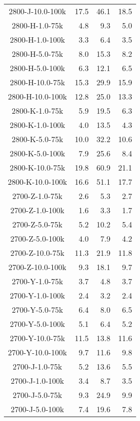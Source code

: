 \begin{longtable}{crrr}
    2800-J-10.0-100k &   17.5 &   46.1 &   18.5 \\
    2800-H-1.0-75k   &    4.8 &    9.3 &    5.0 \\
    2800-H-1.0-100k  &    3.3 &    6.4 &    3.5 \\
    2800-H-5.0-75k   &    8.0 &   15.3 &    8.2 \\
    2800-H-5.0-100k  &    6.3 &   12.1 &    6.5 \\
    2800-H-10.0-75k  &   15.3 &   29.9 &   15.9 \\
    2800-H-10.0-100k &   12.8 &   25.0 &   13.3 \\
    2800-K-1.0-75k   &    5.9 &   19.5 &    6.3 \\
    2800-K-1.0-100k  &    4.0 &   13.5 &    4.3 \\
    2800-K-5.0-75k   &   10.0 &   32.2 &   10.6 \\
    2800-K-5.0-100k  &    7.9 &   25.6 &    8.4 \\
    2800-K-10.0-75k  &   19.8 &   60.9 &   21.1 \\
    2800-K-10.0-100k &   16.6 &   51.1 &   17.7 \\
    2700-Z-1.0-75k   &    2.6 &    5.3 &    2.7 \\
    2700-Z-1.0-100k  &    1.6 &    3.3 &    1.7 \\
    2700-Z-5.0-75k   &    5.2 &   10.2 &    5.4 \\
    2700-Z-5.0-100k  &    4.0 &    7.9 &    4.2 \\
    2700-Z-10.0-75k  &   11.3 &   21.9 &   11.8 \\
    2700-Z-10.0-100k &    9.3 &   18.1 &    9.7 \\
    2700-Y-1.0-75k   &    3.7 &    4.8 &    3.7 \\
    2700-Y-1.0-100k  &    2.4 &    3.2 &    2.4 \\
    2700-Y-5.0-75k   &    6.4 &    8.0 &    6.5 \\
    2700-Y-5.0-100k  &    5.1 &    6.4 &    5.2 \\
    2700-Y-10.0-75k  &   11.5 &   13.8 &   11.6 \\
    2700-Y-10.0-100k &    9.7 &   11.6 &    9.8 \\
    2700-J-1.0-75k   &    5.2 &   13.6 &    5.5 \\
    2700-J-1.0-100k  &    3.4 &    8.7 &    3.5 \\
    2700-J-5.0-75k   &    9.3 &   24.9 &    9.9 \\
    2700-J-5.0-100k  &    7.4 &   19.6 &    7.8 \\

\end{longtable}
